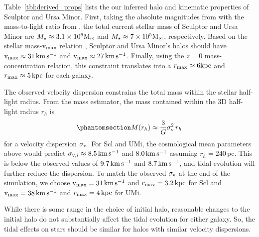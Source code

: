 Table~\ref{tbl:derived_props} lists the our inferred halo and kinematic
properties of Sculptor and Ursa Minor. First, taking the absolute
magnitudes from \citet{munoz+2018} with the mass-to-light ratio from
\citet{woo+courteau+dekel2008}, the total current stellar mass of
Sculptor and Ursa Minor are \(M_\star \approx 3.1 \times 10^6 {\rm M}_{\odot}\) and
\(M_\star \approx 7 \times 10^5 {\rm M}_{\odot}\), respectively. Based on the
stellar mass-\({\rm v}_{\rm max}\) relation \citep[from][]{fattahi+2018}, Sculptor
and Ursa Minor's halos should have \({\rm v}_{\rm max} \approx 31 \,{\rm km\,s^{-1}}\) and
\({\rm v}_{\rm max} \approx 27\,{\rm km\,s^{-1}}\). Finally, using the \citet{ludlow+2016}
\(z=0\) mass-concentration relation, this constraint translates into a
\(r_{\rm max} \approx 6 {\rm kpc}\) and \(r_{\rm max} \approx 5\,{\rm kpc}\) for each
galaxy.

The observed velocity dispersion constrains the total mass within the
stellar half-light radius. From the \citet{wolf+2010} mass estimator,
the mass contained within the 3D half-light radius \(r_h\) is
\begin{equation}\protect\phantomsection\label{eq:wolf_mass}{
M(r_h) \approx \frac{3}{G} \sigma_\V^2\,r_h
}\end{equation} for a velocity dispersion \(\sigma_{\rm v}\). For Scl and
UMi, the cosmological mean parameters above would predict
\(\sigma_{{\rm v}, i}  \approx 8.5\,{\rm km\,s^{-1}}\) and \(8.0\,{\rm km\,s^{-1}}\) assuming
\(r_h=240\,\)pc. This is below the observed values of \(9.7\,{\rm km\,s^{-1}}\) and
\(8.7\,{\rm km\,s^{-1}}\), and tidal evolution will further reduce the dispersion.
To match the observed \(\sigma_{\rm v}\) at the end of the simulation, we
choose \({\rm v}_{\rm max} = 31\,{\rm km\,s^{-1}}\) and \(r_{\rm max}=3.2\,{\rm kpc}\) for Scl and
\({\rm v}_{\rm max}=38\,{\rm km\,s^{-1}}\) and \(r_{\rm max}=4\,{\rm kpc}\) for UMi.

While there is some range in the choice of initial halo, reasonable
changes to the initial halo do not substantially affect the tidal
evolution for either galaxy. So, the tidal effects on stars should be
similar for halos with similar velocity dispersions.

